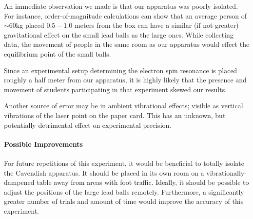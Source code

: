 An immediate observation we made is that our apparatus was poorly isolated. 
For instance, order-of-magnitude calculations can show that an average person of \(\sim 60\)kg placed \(0.5-1.0\) meters from the box can have a similar (if not greater) gravitational effect on the small lead balls as the large ones. 
While collecting data, the movement of people in the same room as our apparatus would effect the equilibrium point of the small balls. 

Since an experimental setup determining the electron spin resonance is placed roughly a half meter from our apparatus, it is highly likely that the presence and movement of students participating in that experiment skewed our results.

Another source of error may be in ambient vibrational effects; visible as vertical vibrations of the laser point on the paper card. 
This has an unknown, but potentially detrimental effect on experimental precision. 

\onecolumn
\singlespacing
\paragraph{Possible Improvements}

\paragraph{} For future repetitions of this experiment, it would be beneficial to totally isolate the Cavendish apparatus. 
It should be placed in its own room on a vibrationally-dampened table away from areas with foot traffic. 
Ideally, it should be possible to adjust the positions of the large lead balls remotely. 
Furthermore, a significantly greater number of trials and amount of time would improve the accuracy of this experiment. 




